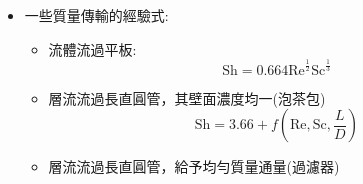\documentclass[../main.tex]{subfiles}
\begin{document}
\begin{itemize}
\begin{itemize}
  \begin{equation}
    \text{Le} = \frac{\alpha}{D_{AB}} = \frac{k}{\rho C_p D_{AB}} = \frac{\text{Thermal Diffusivity}}{\text{Mass Diffusivity}}
  \end{equation}
  \item Prandtl Number:
  \begin{equation}
    \text{Pr} = \frac{\nu}{\alpha} = \frac{C_p\mu}{k} = \frac{\text{Momentum Diffusivity}}{\text{Thermal Diffusivity}}
  \end{equation}
  \item Sherwood Number:\\
  對比熱對流，就是那邊的Nusselt Number，徑向的動量傳輸和質量傳輸比
  \begin{equation}
    \text{Sh} = \frac{k_cL}{D_{AB}} = \frac{\text{Mass Convection Rate}}{\text{Molecular Diffusion Rate}}
  \end{equation}
  若系統為圓柱或球:
  \begin{equation}
    \text{Sh} = \frac{k_cD}{D_{AB}}
  \end{equation}
  \item Peclet Number:\\
  在軸向上的質量傳輸比
  \begin{equation}
    \text{Pe}_M =\text{Re}\cdot\text{Sc} = \frac{\rho u D}{\mu} = \frac{\text{Mass Convection Rate}}{\text{Molecular Diffusion Rate}}
  \end{equation}
  質量跟著液體流動方向傳遞\\
  若$\text{Pe}_M$很大，代表軸向上的質量傳導可以被忽略
  \item Stanton Number:
  \begin{equation}
    \text{St}_M = \frac{\text{Sh}}{\text{Re}\cdot\text{Sc}} = \frac{k_c}{\nu}
  \end{equation}
\end{itemize}
\item 一些質量傳輸的經驗式:
\begin{itemize}
  \item 流體流過平板:
  \begin{equation}
    \text{Sh} = 0.664\text{Re}^{\frac{1}{2}}\text{Sc}^{\frac{1}{3}}
  \end{equation}
  \item 層流流過長直圓管，其壁面濃度均一(泡茶包)
  \begin{equation}
    \text{Sh} = 3.66 + f(\text{Re},\text{Sc},\frac{L}{D})
  \end{equation}
  \item 層流流過長直圓管，給予均勻質量通量(過濾器)

\end{itemize}
\end{itemize}
\end{document}
